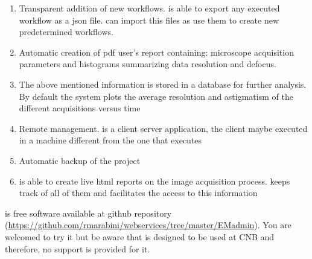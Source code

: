 \begin{enumerate}
 \item Transparent addition of new workflows. \scipion is able to export any executed workflow as a json file. \emadmin can import this files as use them to create new predetermined workflows.
 \item Automatic creation of pdf user's report containing: microscope acquisition parameters and histograms summarizing data resolution and  defocus. 
 \item The above mentioned information is stored in a database for further analysis. By default the system plots the  average resolution and astigmatism of the different acquisitions versus time
 \item Remote management. \emadmin is a client server application, the client maybe executed in a machine different from the one that executes \scipion
 \item Automatic backup of the \scipion project
 \item \scipion is able to create live html reports on the image acquisition process. \emadmin keeps track of all of them and facilitates the access to this information
\end{enumerate}

\emadmin is free software available at github repository (\url{https://github.com/rmarabini/webservices/tree/master/EMadmin}). You are welcomed to try it but be aware that \emadmin is designed to be used at CNB and therefore, no support is provided for it.

